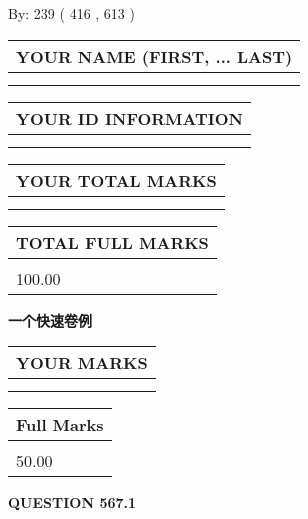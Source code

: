 \documentclass{ctexart}
\begin{document}
   
\hspace{1.0in} By: 
 239 ( 416 ,  613 )
   
   
   
   
\newpage 
\setcounter{page}{ 
   567001 } 
   
   
   
   
\noindent\begin{tabular}{|l|}
\hline
YOUR NAME (FIRST, ... LAST)  \\
\hline
 \\ 
 \\ 
\hline
\end{tabular}
\hspace{0.05in} \begin{tabular}{|l|}
\hline
 YOUR   ID   INFORMATION  \\
\hline
 \\ 
 \\ 
\hline
\end{tabular}
   
   
\vspace{0.2in}\noindent\begin{tabular}{|l|}
\hline
YOUR TOTAL MARKS  \\
\hline
 \\ 
 \\ 
\hline
\end{tabular}
\hspace{0.05in} \begin{tabular}{|l|}
\hline
TOTAL FULL MARKS  \\
\hline
 \\ 
100.00 \\
\hline
\end{tabular}
   
   
 \vspace{0.2in}
{\LARGE {\textbf{ 一个快速卷例}}}
   
   
  
\vspace{0.2in}
  
\noindent\begin{tabular}{|l|}
\hline
 YOUR MARKS  \\
\hline
 \\ 
 \\ 
\hline
\end{tabular}
\hspace{0.05in} \begin{tabular}{|l|}
\hline
 Full Marks  \\
\hline
 \\ 
50.00 \\
\hline
\end{tabular}
{\textbf{\Large{QUESTION
567.1 
}}}
  
\end{document}
